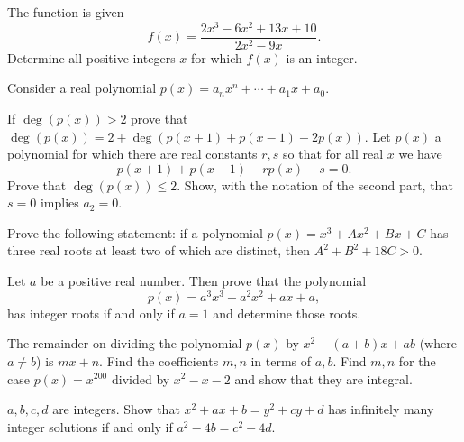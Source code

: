 \documentclass[12pt,a4paper]{memoir}
\theoremstyle{definition}
\begin{document}
\begin{question}[name={2001 Dutch Mathematical Olympiad}]
	The function is given
	\[f(x) = \frac{2x^3 -6x^2 + 13x + 10}{2x^2 - 9x}.\]
	Determine all positive integers $x$ for which $f(x)$ is an integer.
\end{question}

\begin{question}[name={1996 Belgium Flanders}]
	Consider a real polynomial $p(x)=a_nx^n+\cdots+a_1x+a_0$.
	\begin{tasks}
		\task If $\deg(p(x))>2$ prove that $\deg(p(x)) = 2 + \deg(p(x+1)+p(x-1)-2p(x))$.
		\task Let $p(x)$ a polynomial for which there are real constants $r,s$ so that for all real $x$ we have\[ p(x+1)+p(x-1)-rp(x)-s=0. \] Prove that $\deg(p(x))\le 2$.
		\task Show, with the notation of the second part, that $s=0$ implies $a_2=0$.
	\end{tasks}
\end{question}

\begin{question}[name={1996 Germany}]
	Prove the following statement: if a polynomial $p(x) = x^3 + Ax^2 + Bx +C$ has three real roots at least two of which are distinct, then $A^2 +B^2 +18C > 0$.
\end{question}

\begin{question}[name={1998 Germany}]
	Let $a$ be a positive real number. Then prove that the polynomial
	\[ p(x)=a^3x^3+a^2x^2+ax+a, \]
	has integer roots if and only if $a=1$ and determine those roots.
\end{question}


\begin{question}[name={1979 Brazil}]
	The remainder on dividing the polynomial $p(x)$ by $x^2 - (a+b)x + ab$ (where $a \not = b$) is $mx + n$. Find the coefficients $m, n$ in terms of $a, b$. Find $m, n$ for the case $p(x) = x^{200}$ divided by $x^2 - x - 2$ and show that they are integral.
\end{question}



\begin{question}[name={1985 Brazil}]
	$a, b, c, d$ are integers. Show that $x^2 + ax + b = y^2 + cy + d$ has infinitely many integer solutions if and only if $a^2 - 4b = c^2 - 4d$.
\end{question}
\end{document}

